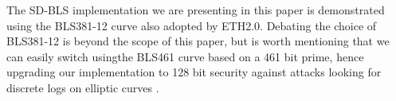 \documentclass[conference]{IEEEtran}
\begin{document}
The SD-BLS implementation we are presenting in this paper is
demonstrated using the BLS381-12 curve \cite{bls381-12} also adopted
by ETH2.0. Debating the choice of BLS381-12 is beyond the scope of
this paper, but is worth mentioning that we can easily switch usingthe
BLS461 curve based on a 461 bit prime, hence upgrading our
implementation to 128 bit security \cite{updating-key-pairings}
against attacks looking for discrete logs on elliptic curves
\cite{discrete-log-attack}.



\end{document}
